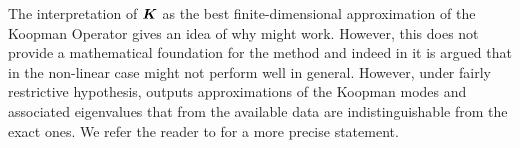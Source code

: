 The interpretation of $\vb*{K}$ as the best finite-dimensional approximation of the Koopman Operator gives an idea of why  might work. However, this does not provide a mathematical foundation for the method and indeed in \cite{tu_dynamic_2014, bagheri_koopman-mode_2013} it is argued that in the non-linear case  might not perform well in general. However, under fairly restrictive hypothesis,  outputs approximations of the Koopman modes and associated eigenvalues that from the available data are indistinguishable from the exact ones. We refer the reader to \cite{rowley_spectral_2009, tu_dynamic_2014} for a more precise statement.

